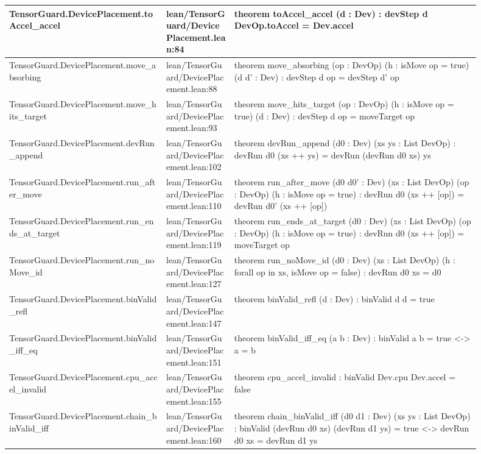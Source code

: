 \documentclass[10pt]{article}
\begin{document}
\begin{longtable}{|p{0.30\linewidth}|p{0.13\linewidth}|p{0.47\linewidth}|}
\hline
TensorGuard.DevicePlacement.toAccel\_accel & lean/TensorGuard/DevicePlacement.lean:84 & theorem toAccel\_accel (d : Dev) : devStep d DevOp.toAccel = Dev.accel \\
\hline
TensorGuard.DevicePlacement.move\_absorbing & lean/TensorGuard/DevicePlacement.lean:88 & theorem move\_absorbing (op : DevOp) (h : isMove op = true) (d d' : Dev) : devStep d op = devStep d' op \\
\hline
TensorGuard.DevicePlacement.move\_hits\_target & lean/TensorGuard/DevicePlacement.lean:93 & theorem move\_hits\_target (op : DevOp) (h : isMove op = true) (d : Dev) : devStep d op = moveTarget op \\
\hline
TensorGuard.DevicePlacement.devRun\_append & lean/TensorGuard/DevicePlacement.lean:102 & theorem devRun\_append (d0 : Dev) (xs ys : List DevOp) : devRun d0 (xs ++ ys) = devRun (devRun d0 xs) ys \\
\hline
TensorGuard.DevicePlacement.run\_after\_move & lean/TensorGuard/DevicePlacement.lean:110 & theorem run\_after\_move (d0 d0' : Dev) (xs : List DevOp) (op : DevOp) (h : isMove op = true) : devRun d0 (xs ++ [op]) = devRun d0' (xs ++ [op]) \\
\hline
TensorGuard.DevicePlacement.run\_ends\_at\_target & lean/TensorGuard/DevicePlacement.lean:119 & theorem run\_ends\_at\_target (d0 : Dev) (xs : List DevOp) (op : DevOp) (h : isMove op = true) : devRun d0 (xs ++ [op]) = moveTarget op \\
\hline
TensorGuard.DevicePlacement.run\_noMove\_id & lean/TensorGuard/DevicePlacement.lean:127 & theorem run\_noMove\_id (d0 : Dev) (xs : List DevOp) (h : forall op in xs, isMove op = false) : devRun d0 xs = d0 \\
\hline
TensorGuard.DevicePlacement.binValid\_refl & lean/TensorGuard/DevicePlacement.lean:147 & theorem binValid\_refl (d : Dev) : binValid d d = true \\
\hline
TensorGuard.DevicePlacement.binValid\_iff\_eq & lean/TensorGuard/DevicePlacement.lean:151 & theorem binValid\_iff\_eq (a b : Dev) : binValid a b = true <-> a = b \\
\hline
TensorGuard.DevicePlacement.cpu\_accel\_invalid & lean/TensorGuard/DevicePlacement.lean:155 & theorem cpu\_accel\_invalid : binValid Dev.cpu Dev.accel = false \\
\hline
TensorGuard.DevicePlacement.chain\_binValid\_iff & lean/TensorGuard/DevicePlacement.lean:160 & theorem chain\_binValid\_iff (d0 d1 : Dev) (xs ys : List DevOp) : binValid (devRun d0 xs) (devRun d1 ys) = true <-> devRun d0 xs = devRun d1 ys \\

\end{longtable}
\end{document}
